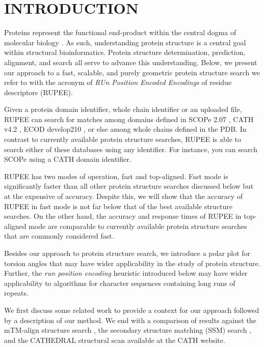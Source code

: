 \documentclass[a4,center,fleqn]{NAR}
\begin{document}
\section{INTRODUCTION}

Proteins represent the functional end-product within the central dogma of molecular biology \cite{Crick1970}.
As such, understanding protein structure is a central goal within structural bioinformatics. 
Protein structure determination, prediction, alignment, and search all serve to advance this understanding. 
Below, we present our approach to a fast, scalable, and purely geometric protein structure search we refer to with the acronym of \emph{RUn Position Encoded Encodings} of residue descriptors (RUPEE).

Given a protein domain identifier, whole chain identifier or an uploaded file, RUPEE can search for matches among domains defined in SCOPe 2.07 \cite{Fox2013}, CATH v4.2 \cite{Orengo1997}, ECOD develop210 \cite{Cheng2014}, or else among whole chains defined in the PDB.
In contrast to currently available protein structure searches, RUPEE is able to search either of these databases using any identifier. 
For instance, you can search SCOPe using a CATH domain identifier. 

RUPEE has two modes of operation, fast and top-aligned. 
Fast mode is significantly faster than all other protein structure searches discussed below but at the expensive of accuracy.
Despite this, we will show that the accuracy of RUPEE in fast mode is not far below that of the best available structure searches. 
On the other hand, the accuracy and response times of RUPEE in top-aligned mode are comparable to currently available protein structure searches that are commonly considered fast. 

Besides our approach to protein structure search, we introduce a polar plot for torsion angles that may have wider applicability in the study of protein structure. 
Further, the \emph{run position encoding} heuristic introduced below may have wider applicability to algorithms for character sequences containing long runs of repeats. 

We first discuss some related work to provide a context for our approach followed by a description of our method. 
We end with a comparison of results against the mTM-align structure search \cite{Dong2018}, the secondary structure matching (SSM) search \cite{Krissinel2004}, and the CATHEDRAL structural scan \cite{Redfern2007} available at the CATH website.
\end{document}
